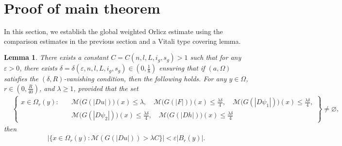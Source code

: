 \documentclass[10pt,a4paper]{article}
\newtheorem{lemma}[theorem]{Lemma}
\theoremstyle{definition}
\numberwithin{equation}{section}
\begin{document}
	


\section{Proof of main theorem } 
 
 In this section, we establish the global weighted Orlicz estimate using the comparison estimates in the previous section and a Vitali type covering lemma.
 
 \begin{lemma}\label{lem5.1}
 	There exists a constant $C = C(n,l,L,i_g, s_g ) > 1$ such that for any $\varepsilon > 0$, there exists $\delta = \delta(\varepsilon,n,l,L,i_g, s_g) \in (0, \frac{1}{8})$ ensuring that if $(a, \Omega)$ satisfies the $(\delta, R)$-vanishing condition, then the following holds. For any $y \in \Omega$, $r \in (0, \frac{R}{40})$, and $\lambda \geq 1$, provided that the set 
 	\begin{align}\label{ml}
 		&\left\{
 		\begin{aligned}
 			x\in\Omega_r(y):\quad
 			&\mathcal{M}\bigl(G(|Du|)\bigr)(x)\leq\lambda,\quad
 			\mathcal{M}\bigl(G(|F|)\bigr)(x)\leq\frac{\lambda\delta}{4},\quad
 			\mathcal{M}\bigl(G(|D\psi_1|)\bigr)(x)\leq\frac{\lambda\delta}{4},
 			\\
 			&\mathcal{M}\bigl(G(|D\psi_2|)\bigr)(x)\leq\frac{\lambda\delta}{4},\quad
 			\mathcal{M}\bigl(G(|Dh|)\bigr)(x)\leq\frac{\lambda\delta}{4}
 		\end{aligned}
 		\right\}
 		\neq\varnothing,
 	\end{align}
 	then
 	\begin{align}
 		|\{x \in \Omega_r(y) : \mathcal{M}(G(|Du|)) > \lambda C\}| < \varepsilon |B_r(y)|.
 	\end{align}
 \end{lemma}
 
\end{document}

